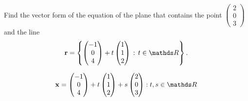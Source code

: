 \begin{problem}{\problemnum}
Find the vector form of the equation of the plane that contains the point $\begin{pmatrix}2\\0\\3\end{pmatrix}$ and the line
\[\br=\left\{\begin{pmatrix}-1\\0\\4\end{pmatrix} + t\begin{pmatrix}1\\1\\2\end{pmatrix} \, : \,t \in \bbR \right\}.\]
\end{problem}

\begin{solution}
    \[ \bx =  \vvv{-1}{0}{4}
           + t\vvv{1}{1}{2}
           + s\vvv{2}{0}{3}
           : t, s
           \in \bbR
    \]
\end{solution}
